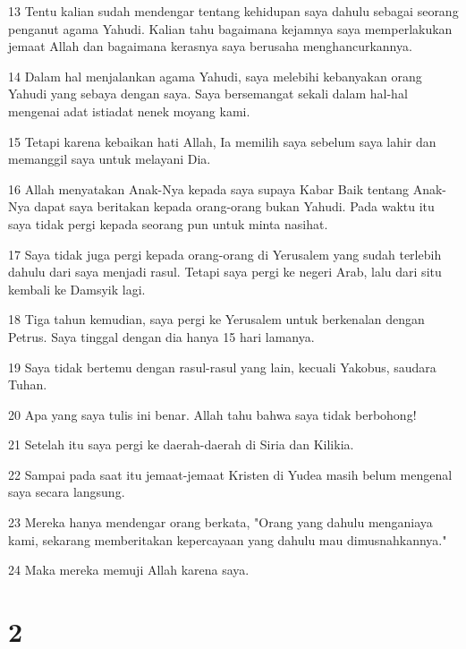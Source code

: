 \par 13 Tentu kalian sudah mendengar tentang kehidupan saya dahulu sebagai seorang penganut agama Yahudi. Kalian tahu bagaimana kejamnya saya memperlakukan jemaat Allah dan bagaimana kerasnya saya berusaha menghancurkannya.
\par 14 Dalam hal menjalankan agama Yahudi, saya melebihi kebanyakan orang Yahudi yang sebaya dengan saya. Saya bersemangat sekali dalam hal-hal mengenai adat istiadat nenek moyang kami.
\par 15 Tetapi karena kebaikan hati Allah, Ia memilih saya sebelum saya lahir dan memanggil saya untuk melayani Dia.
\par 16 Allah menyatakan Anak-Nya kepada saya supaya Kabar Baik tentang Anak-Nya dapat saya beritakan kepada orang-orang bukan Yahudi. Pada waktu itu saya tidak pergi kepada seorang pun untuk minta nasihat.
\par 17 Saya tidak juga pergi kepada orang-orang di Yerusalem yang sudah terlebih dahulu dari saya menjadi rasul. Tetapi saya pergi ke negeri Arab, lalu dari situ kembali ke Damsyik lagi.
\par 18 Tiga tahun kemudian, saya pergi ke Yerusalem untuk berkenalan dengan Petrus. Saya tinggal dengan dia hanya 15 hari lamanya.
\par 19 Saya tidak bertemu dengan rasul-rasul yang lain, kecuali Yakobus, saudara Tuhan.
\par 20 Apa yang saya tulis ini benar. Allah tahu bahwa saya tidak berbohong!
\par 21 Setelah itu saya pergi ke daerah-daerah di Siria dan Kilikia.
\par 22 Sampai pada saat itu jemaat-jemaat Kristen di Yudea masih belum mengenal saya secara langsung.
\par 23 Mereka hanya mendengar orang berkata, "Orang yang dahulu menganiaya kami, sekarang memberitakan kepercayaan yang dahulu mau dimusnahkannya."
\par 24 Maka mereka memuji Allah karena saya.

\chapter{2}


